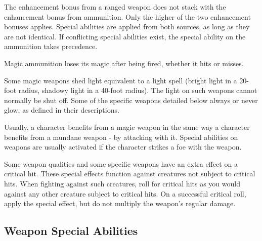                  The enhancement bonus from a ranged weapon does not stack with the enhancement bonus from ammunition.
                Only the higher of the two enhancement bonuses applies.
                Special abilities are applied from both sources, as long as they are not identical.
                If conflicting special abilities exist, the special ability on the ammunition takes precedence.

                Magic ammunition loses its magic after being fired, whether it hits or misses.

                 Some magic weapons shed light equivalent to a light spell (bright light in a 20-foot radius, shadowy light in a 40-foot radius).
                The light on such weapons cannot normally be shut off.
                Some of the specific weapons detailed below always or never glow, as defined in their descriptions.

                 Usually, a character benefits from a magic weapon in the same way a character benefits from a mundane weapon - by attacking with it.
                Special abilities on weapons are usually activated if the character strikes a foe with the weapon.

                 Some weapon qualities and some specific weapons have an extra effect on a critical hit.
                These special effects function against creatures not subject to critical hits.
                When fighting against such creatures, roll for critical hits as you would against any other creature subject to critical hits.
                On a successful critical roll, apply the special effect, but do not multiply the weapon's regular damage.

        \subsection{Weapon Special Abilities}\label{Weapon Special Abilities}

